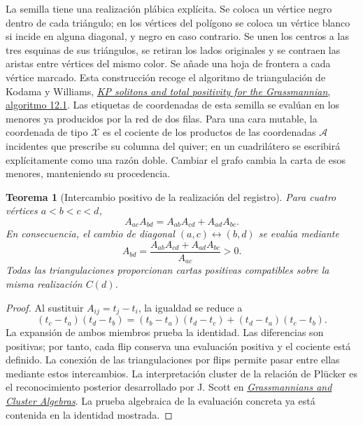 \documentclass[a4paper,10pt]{article}
\newtheorem{theorem}{Teorema}[section]
\theoremstyle{definition}\newtheorem{definition}[theorem]{Definición}
\theoremstyle{remark}\newtheorem{remark}[theorem]{Observación}
\numberwithin{equation}{section}
\begin{document}
La semilla tiene una realización plábica explícita. Se coloca un vértice
negro dentro de cada triángulo; en los vértices del polígono se coloca un
vértice blanco si incide en alguna diagonal, y negro en caso contrario.
Se unen los centros a las tres esquinas de sus triángulos, se retiran los
lados originales y se contraen las aristas entre vértices del mismo color.
Se añade una hoja de frontera a cada vértice marcado. Esta construcción
recoge el algoritmo de triangulación de Kodama y Williams,
\href{https://people.math.harvard.edu/~williams/papers/KW-ArxivVersion.pdf}
{\emph{KP solitons and total positivity for the Grassmannian}, algoritmo 12.1}.
Las etiquetas de coordenadas de esta semilla se evalúan en los menores ya
producidos por la red de dos filas. Para una cara mutable, la coordenada
de tipo \(\mathcal X\) es el cociente de los productos de las
coordenadas \(\mathcal A\) incidentes que prescribe su columna del
quiver; en un cuadrilátero se escribirá explícitamente como una razón
doble. Cambiar el grafo cambia la carta de esos menores, manteniendo su
procedencia.

\begin{theorem}[Intercambio positivo de la realización del registro]
\label{thm:nc-ptolemy}
Para cuatro vértices \(a<b<c<d\),
\begin{equation}
 A_{ac}A_{bd}=A_{ab}A_{cd}+A_{ad}A_{bc}.
 \label{eq:nc-ptolemy}
\end{equation}
En consecuencia, el cambio de diagonal \((a,c)\leftrightarrow(b,d)\)
se evalúa mediante
\[
 A_{bd}=\frac{A_{ab}A_{cd}+A_{ad}A_{bc}}{A_{ac}}>0.
\]
Todas las triangulaciones proporcionan cartas positivas compatibles sobre
la misma realización \(C(d)\).
\end{theorem}
\begin{proof}
Al sustituir \(A_{ij}=t_j-t_i\), la igualdad se reduce a
\[
 (t_c-t_a)(t_d-t_b)
 =(t_b-t_a)(t_d-t_c)+(t_d-t_a)(t_c-t_b).
\]
La expansión de ambos miembros prueba la identidad. Las diferencias son
positivas; por tanto, cada flip conserva una evaluación positiva y el
cociente está definido. La conexión de las triangulaciones por flips
permite pasar entre ellas mediante estos intercambios. La interpretación
cluster de la relación de Plücker es el reconocimiento posterior desarrollado
por J. Scott en
\href{https://arxiv.org/abs/math/0311148}{\emph{Grassmannians and Cluster
Algebras}}. La prueba algebraica de la evaluación concreta ya está contenida
en la identidad mostrada.
\end{proof}
\end{document}
